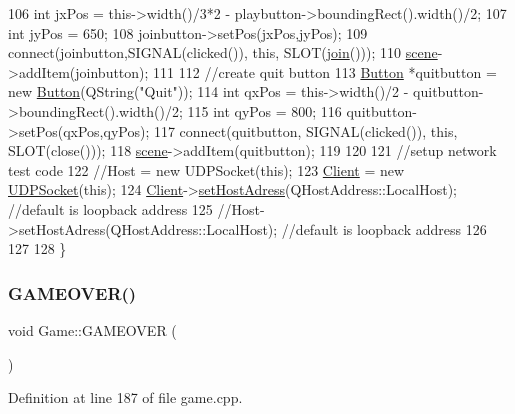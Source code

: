 \begin{DoxyCode}
106     \textcolor{keywordtype}{int} jxPos = this->width()/3*2 - playbutton->boundingRect().width()/2;
107     \textcolor{keywordtype}{int} jyPos = 650;
108     joinbutton->setPos(jxPos,jyPos);
109     connect(joinbutton,SIGNAL(clicked()), \textcolor{keyword}{this}, SLOT(\hyperlink{class_game_ae95e1d94393a35f3d4edda97ebfc3358}{join}()));
110     \hyperlink{class_game_a8119e3b9a632906c6808fa294b46a92a}{scene}->addItem(joinbutton);
111 
112     \textcolor{comment}{//create quit button}
113     \hyperlink{class_button}{Button} *quitbutton = \textcolor{keyword}{new} \hyperlink{class_button}{Button}(QString(\textcolor{stringliteral}{"Quit"}));
114     \textcolor{keywordtype}{int} qxPos = this->width()/2 - quitbutton->boundingRect().width()/2;
115     \textcolor{keywordtype}{int} qyPos = 800;
116     quitbutton->setPos(qxPos,qyPos);
117     connect(quitbutton, SIGNAL(clicked()), \textcolor{keyword}{this}, SLOT(close()));
118     \hyperlink{class_game_a8119e3b9a632906c6808fa294b46a92a}{scene}->addItem(quitbutton);
119 
120 
121     \textcolor{comment}{//setup network test code}
122     \textcolor{comment}{//Host = new UDPSocket(this);}
123     \hyperlink{class_game_aa7fd8508fad68c550129f2be61c37467}{Client} = \textcolor{keyword}{new} \hyperlink{class_u_d_p_socket}{UDPSocket}(\textcolor{keyword}{this});
124     \hyperlink{class_game_aa7fd8508fad68c550129f2be61c37467}{Client}->\hyperlink{class_u_d_p_socket_a5bdac3040e57d37c503fdd3293b6d053}{setHostAdress}(QHostAddress::LocalHost); \textcolor{comment}{//default is loopback address}
125     \textcolor{comment}{//Host->setHostAdress(QHostAddress::LocalHost); //default is loopback address}
126 
127 
128 \}
\end{DoxyCode}
\mbox{\label{class_game_a838e89640d4cfbd7d7b7ee105135d4b8}} 
\subsubsection{\texorpdfstring{G\+A\+M\+E\+O\+V\+E\+R()}{GAMEOVER()}}
{\footnotesize\ttfamily void Game\+::\+G\+A\+M\+E\+O\+V\+ER (\begin{DoxyParamCaption}{ }\end{DoxyParamCaption})}



Definition at line 187 of file game.\+cpp.


